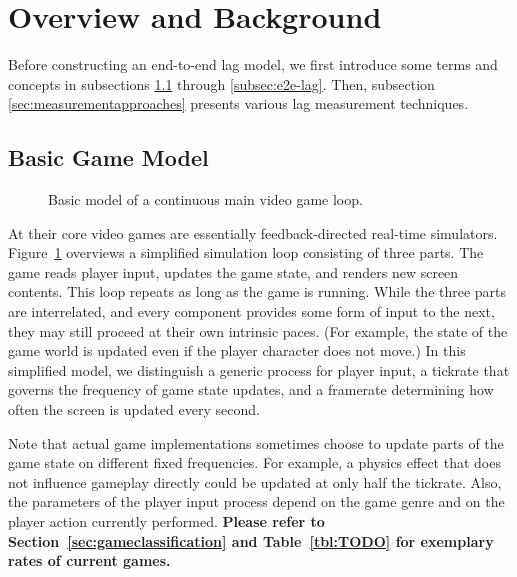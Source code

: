 \section{Overview and Background}
\label{sec:background}

Before constructing an end-to-end lag model, we first introduce some terms 
and concepts in subsections \ref{subsec:game-model} through 
\ref{subsec:e2e-lag}. Then, subsection \ref{sec:measurementapproaches} 
presents various lag measurement techniques.


\subsection{Basic Game Model}\label{subsec:game-model}

\begin{figure}[!t]
\centering
\removelatexerror
\begin{algorithm}[H]
\end{algorithm}
\caption{Basic model of a continuous main video game loop.}
\label{alg:gameloop1}
\end{figure}

At their core video games are essentially feedback-directed 
real-time simulators. Figure~\ref{alg:gameloop1} overviews a 
simplified simulation loop consisting of three parts.
The game reads player input, updates the game state, and renders 
new screen contents. This loop repeats as long as the game is running. 
While the three parts are interrelated, and every component provides 
some form of input to the next, they may still proceed at their own 
intrinsic paces. (For example, the state of the game world is updated 
even if the player character does not move.)
In this simplified model, we distinguish a generic process for player 
input, a tickrate that governs the frequency of game state updates, and 
a framerate determining how often the screen is updated every second.

Note that actual game implementations sometimes choose to update 
parts of the game state on different fixed frequencies. For example, 
a physics effect that does not influence gameplay directly could be 
updated at only half the tickrate. Also, the parameters of the player 
input process depend on the game genre and on the player action 
currently performed. \textbf{Please refer to 
Section~\ref{sec:gameclassification} and Table~\ref{tbl:TODO} for 
exemplary rates of current games.}

